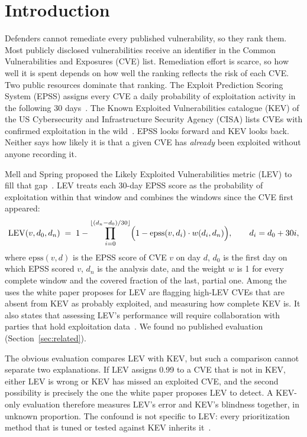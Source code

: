 
\section{Introduction}\label{sec:intro}

Defenders cannot remediate every published vulnerability, so they rank them.
Most publicly disclosed vulnerabilities receive an identifier in the Common
Vulnerabilities and Exposures (CVE) list. Remediation effort is scarce, so how
well it is spent depends on how well the ranking reflects the risk of each CVE.
Two public resources dominate that ranking. The Exploit Prediction Scoring
System (EPSS) assigns every CVE a daily probability of exploitation activity
in the following 30 days~\cite{jacobs2021epss,jacobs2023epssv3}. The
Known Exploited Vulnerabilities catalogue (KEV) of the US Cybersecurity and
Infrastructure Security Agency (CISA) lists CVEs with confirmed exploitation
in the wild~\cite{cisa2022kev}. EPSS looks forward and KEV looks back. Neither
says how likely it is that a given CVE has \emph{already} been exploited
without anyone recording it.

Mell and Spring proposed the Likely Exploited Vulnerabilities metric (LEV) to
fill that gap~\cite{mell2025lev}. LEV treats each 30-day EPSS score as the
probability of exploitation within that window and combines the windows since
the CVE first appeared:
\begin{equation}\label{eq:lev}
\mathrm{LEV}(v, d_0, d_n) \;=\; 1 - \prod_{i=0}^{\lfloor (d_n - d_0)/30 \rfloor}
\Bigl(1 - \mathrm{epss}(v, d_i)\cdot w(d_i, d_n)\Bigr),
\qquad d_i = d_0 + 30i,
\end{equation}
where $\mathrm{epss}(v,d)$ is the EPSS score of CVE $v$ on day $d$, $d_0$ is
the first day on which EPSS scored $v$, $d_n$ is the analysis date, and the
weight $w$ is 1 for every complete window and the covered fraction of the
last, partial one. Among the uses the white paper proposes for LEV are
flagging high-LEV CVEs that are absent from KEV as probably exploited, and
measuring how complete KEV is. It also states that assessing LEV's performance will require
collaboration with parties that hold exploitation data~\cite{mell2025lev}. We
found no published evaluation (Section~\ref{sec:related}).

The obvious evaluation compares LEV with KEV, but such a comparison cannot
separate two explanations. If LEV assigns 0.99 to a CVE that is not in KEV,
either LEV is wrong or KEV has missed an exploited CVE, and the second
possibility is precisely the one the white paper proposes LEV to detect. A
KEV-only evaluation therefore measures LEV's error and KEV's blindness
together, in unknown proportion. The confound is not specific to LEV: every
prioritization method that is tuned or tested against KEV inherits
it~\cite{shimizu2026chaining,sherif2026kri,motamedi2026threatlens}.

